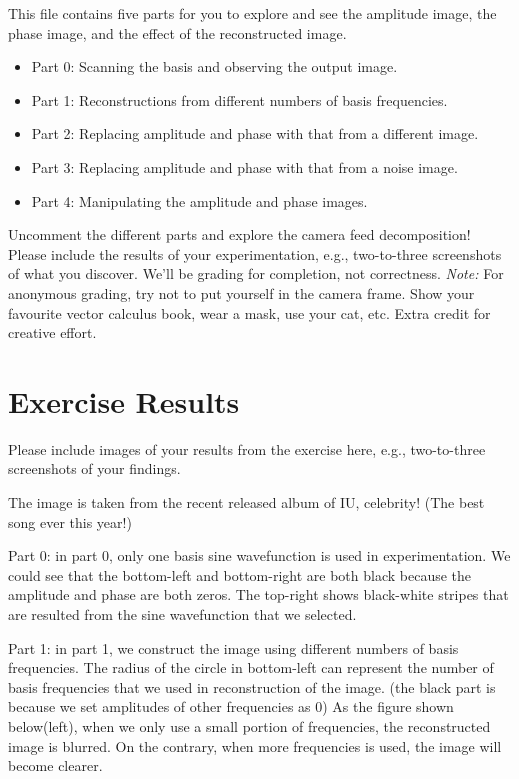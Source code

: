 This file contains five parts for you to explore and see the amplitude image, the phase image, and the effect of the reconstructed image.
\begin{itemize}
    \item Part 0: Scanning the basis and observing the output image.
    \item Part 1: Reconstructions from different numbers of basis frequencies.
    \item Part 2: Replacing amplitude and phase with that from a different image.
    \item Part 3: Replacing amplitude and phase with that from a noise image.
    \item Part 4: Manipulating the amplitude and phase images.
\end{itemize}

Uncomment the different parts and explore the camera feed decomposition! Please include the results of your experimentation, e.g., two-to-three screenshots of what you discover. We'll be grading for completion, not correctness. \emph{Note:} For anonymous grading, try not to put yourself in the camera frame. Show your favourite vector calculus book, wear a mask, use your cat, etc. Extra credit for creative effort.


\pagebreak
\section*{Exercise Results}
Please include images of your results from the exercise here, e.g., two-to-three screenshots of your findings.

The image is taken from the recent released album of IU, celebrity! (The best song ever this year!)

Part 0: in part 0, only one basis sine wavefunction is used in experimentation. We could see that the bottom-left and bottom-right are both black because the amplitude and phase are both zeros. The top-right shows black-white stripes that are resulted from the sine wavefunction that we selected.  


Part 1: in part 1, we construct the image using different numbers of basis frequencies. The radius of the circle in bottom-left can represent the number of basis frequencies that we used in reconstruction of the image. (the black part is because we set amplitudes of other frequencies as 0) As the figure shown below(left), when we only use a small portion of frequencies, the reconstructed image is blurred. On the contrary, when more frequencies is used, the image will become clearer.

